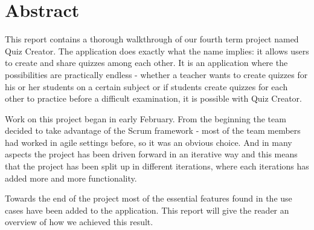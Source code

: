 \chapter*{Abstract}
This report contains a thorough walkthrough of our fourth term project named Quiz Creator. The application does exactly what the name implies: it allows users to create and share quizzes among each other. It is an application where the possibilities are practically endless - whether a teacher wants to create quizzes for his or her students on a certain subject or if students create quizzes for each other to practice before a difficult examination, it is possible with Quiz Creator. 

Work on this project began in early February. From the beginning the team decided to take advantage of the Scrum framework - most of the team members had worked in agile settings before, so it was an obvious choice. And in many aspects the project has been driven forward in an iterative way and this means that the project has been split up in different iterations, where each iterations has added more and more functionality. 

Towards the end of the project most of the essential features found in the use cases have been added to the application. This report will give the reader an overview of how we achieved this result. 